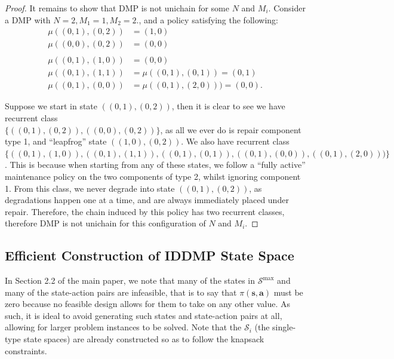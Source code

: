 \documentclass[11pt,authoryear,a4paper]{article}
\theoremstyle{definition}
\begin{document}
\begin{proof}
    It remains to show that DMP is not unichain for some $N$ and $M_i$. Consider a DMP with $N=2, M_1 = 1, M_2 = 2.$, and a policy satisfying the following:
    \begin{align*}
        \mu((0,1),(0,2)) &= (1,0)\\
        \mu((0,0),(0,2)) &= (0,0)\\
        &\\
        \mu((0,1),(1,0)) &= (0,0)\\
        \mu((0,1),(1,1)) &= \mu((0,1),(0,1)) = (0,1)\\
        \mu((0,1),(0,0)) &= \mu((0,1),(2,0))) = (0,0).
    \end{align*}

    Suppose we start in state $((0,1),(0,2))$, then it is clear to see we have recurrent class\\ $\{((0,1),(0,2)),((0,0),(0,2))\}$, as all we ever do is repair component type 1, and ``leapfrog'' state $((1,0),(0,2))$. We also have recurrent class\\ $\{((0,1),(1,0)),((0,1),(1,1)),((0,1),(0,1)),((0,1),(0,0)),((0,1),(2,0)))\}$. This is because when starting from any of these states, we follow a ``fully active'' maintenance policy on the two components of type 2, whilst ignoring component 1. From this class, we never degrade into state $((0,1),(0,2))$, as degradations happen one at a time, and are always immediately placed under repair. Therefore, the chain induced by this policy has two recurrent classes, therefore DMP is not unichain for this configuration of $N$ and $M_i$.
\end{proof}

\subsection{Efficient Construction of IDDMP State Space}

In Section 2.2 of the main paper, we note that many of the states in $\mathcal{S}^{\max}$ and many of the state-action pairs are infeasible, that is to say that $\pi(\bm{s},\bm{a})$ must be zero because no feasible design allows for them to take on any other value. As such, it is ideal to avoid generating such states and state-action pairs at all, allowing for larger problem instances to be solved. Note that the $\mathcal{S}_i$ (the single-type state spaces) are already constructed so as to follow the knapsack constraints.
\end{document}
